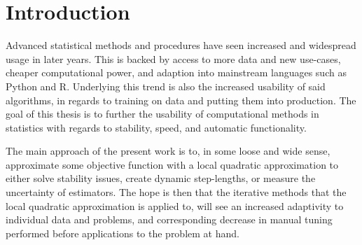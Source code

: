 \chapter{Introduction}

Advanced statistical methods and procedures have seen increased and widespread usage in later years.
This is backed by access to more data and new use-cases, cheaper computational power, and adaption into mainstream languages such as Python and R.
Underlying this trend is also the increased usability of said algorithms, in regards to training on data and putting them into production.
The goal of this thesis is to further the usability of computational methods in statistics with regards to stability, speed, and automatic functionality.

The main approach of the present work is to, in some loose and wide sense, approximate some objective function with a local quadratic approximation to either solve stability issues, create dynamic step-lengths, or measure the uncertainty of estimators.
The hope is then that the iterative methods that the local quadratic approximation is applied to, will see an increased adaptivity to individual data and problems, and corresponding decrease in manual tuning performed before applications to the problem at hand.

